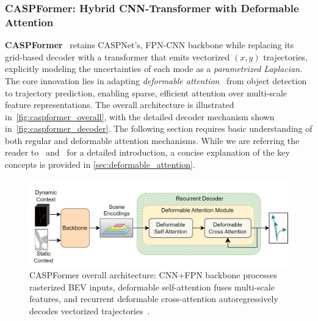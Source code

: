 \begin{description}[leftmargin=1em,itemsep=2pt]
\subsubsection*{CASPFormer: Hybrid CNN-Transformer with Deformable Attention}
\label{ssec:caspformer}

\textbf{CASPFormer}~\cite{caspformerYadav2024} retains CASPNet's, FPN-CNN backbone while replacing its grid-based decoder with a transformer that emits vectorized \((x,y)\) trajectories, explicitly modeling the uncertainties of each mode as a \emph{parametrized Laplacian}. The core innovation lies in adapting \emph{deformable attention}~\cite{zhu2021deformabledetr} from object detection to trajectory prediction, enabling sparse, efficient attention over multi-scale feature representations. The overall architecture is illustrated in~\autoref{fig:caspformer_overall}, with the detailed decoder mechanism shown in~\autoref{fig:caspformer_decoder}. The following section requires basic understanding of both regular and deformable attention mechanisms. While we are referring the reader to~\cite{vaswani2023attention} and~\cite{zhu2021deformabledetr} for a detailed introduction, a concise explanation of the key concepts is provided in \autoref{sec:deformable_attention}.

\begin{figure}[ht]
  \centering
  \includegraphics[width=\linewidth]{figures/caspformer-overall-arch.jpg}
  \caption{CASPFormer overall architecture: CNN+FPN backbone processes rasterized BEV inputs, deformable self-attention fuses multi-scale features, and recurrent deformable cross-attention autoregressively decodes vectorized trajectories~\cite{caspformerYadav2024}.}
  \label{fig:caspformer_overall}
\end{figure}


\end{description}
